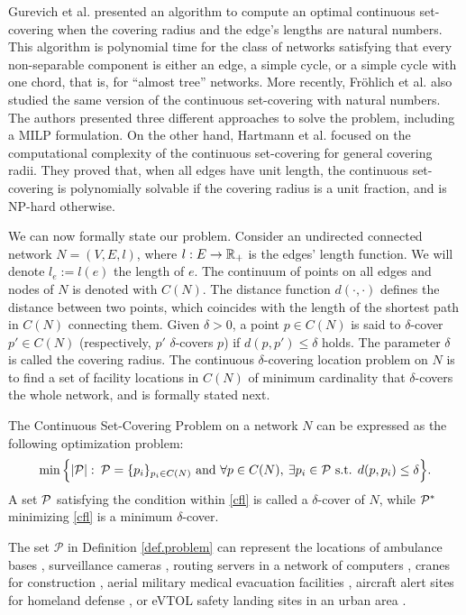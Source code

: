 Gurevich et al. \cite{Gurevich84} presented an algorithm to compute an optimal continuous set-covering when the covering radius and the edge's lengths are natural numbers. This algorithm is polynomial time for the class of networks satisfying that every non-separable component is either an edge, a simple cycle, or a simple cycle with one chord, that is, for ``almost tree'' networks. More recently, Fr\"ohlich et al.  \cite{Hamacher20} also studied the same version of the continuous set-covering with natural numbers. The authors presented three different approaches to solve the problem, including a MILP formulation. On the other hand, Hartmann et al. \cite{Hartmann21} focused on the computational complexity of the continuous set-covering for general covering radii. They proved that, when all edges have unit length, the continuous set-covering is polynomially solvable if the covering radius is a unit fraction, and is NP-hard otherwise.

We can now formally state our problem. Consider an undirected connected network $N=(V,E,l)$, where $l:E \to \mathbb R_+$ is the edges' length function. We will denote $l_e:=l(e)$ the length of $e$. The continuum of points on all edges and nodes of $N$ is denoted with $C(N)$. The distance function $d(\cdot,\cdot)$ defines the distance between two points, which coincides with the length of the shortest path in $C(N)$ connecting them.  Given $\delta > 0$, a point $p\in C(N)$ is said to $\delta$-cover $p'\in C(N)$  (respectively, $p'$ $\delta$-covers $p$) if $d(p,p')\le \delta$ holds. The parameter $\delta$ is called the covering radius. The continuous $\delta$-covering location problem on $N$ is to find a set of facility locations in $C(N)$ of minimum cardinality that $\delta$-covers the whole network, and is formally stated next.
\begin{definition}\label{def.problem}
The Continuous Set-Covering Problem on a network $N$ can be expressed as the following optimization problem:
\begin{equation}
\label{cfl}
	\min\Big\{|\mathcal P|: \: \mathcal P=\{p_i\}_{p_i\in C(N)} \textup{ and } \forall p\in C(N), \: \exists p_i\in \mathcal P \textup{ s.t. } d(p,p_i)\leq \delta\Big\}.
\end{equation}
A set $\mathcal P$ satisfying the condition within \eqref{cfl} is called a $\delta$-cover of $N$, while $\mathcal P^*$ minimizing \eqref{cfl} is a minimum $\delta$-cover.
\end{definition}
The set $\mathcal{P}$ in Definition \ref{def.problem} can represent the locations of ambulance bases  \cite{health}, surveillance cameras \cite{Gusev20}, routing servers in a network of computers \cite{worm}, cranes for construction \cite{crane}, aerial military medical evacuation facilities \cite{military}, aircraft alert sites for homeland defense \cite{homeland}, or eVTOL safety landing sites in an urban area \cite{liding}. 


